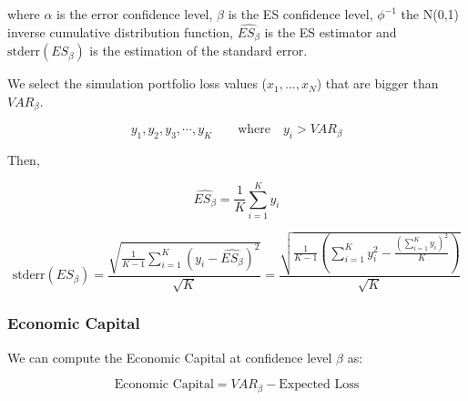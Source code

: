 \documentclass[a4paper,12pt,final]{article}
\begin{document}
where $\alpha$ is the error confidence level, $\beta$ is the ES confidence 
level, $\phi^{-1}$ the N(0,1) inverse cumulative distribution function, 
$\widehat{ES_{\beta}}$ is the ES estimator and $\textrm{stderr}(ES_{\beta})$
is the estimation of the standard error.
\newline

We select the simulation portfolio loss values ($x_1, ..., x_N$) that are bigger 
than $VAR_{\beta}$.

\begin{displaymath}
y_1, y_2, y_3, \cdots, y_K \qquad \textrm{where} \quad y_i > VAR_{\beta}
\end{displaymath}

Then,

\begin{displaymath}
\widehat{ES_{\beta}} = \frac{1}{K} \sum_{i=1}^{K} y_i
\end{displaymath}

\begin{displaymath}
\textrm{stderr}(ES_{\beta}) =
\frac{\sqrt{\frac{1}{K-1} \sum_{i=1}^{K} \left( y_i - \widehat{ES_{\beta}} \right)^2}}{\sqrt{K}} =
\frac{\sqrt{\frac{1}{K-1} \left( \sum_{i=1}^{K} y_i^2 - \frac{\left(\sum_{i=1}^{K} y_i \right)^2}{K} \right)}}{\sqrt{K}}
\end{displaymath}

\subsubsection{Economic Capital}
We can compute the Economic Capital at confidence level $\beta$ as:

\begin{displaymath}
\textrm{Economic Capital} = VAR_{\beta} - \textrm{Expected Loss}
\end{displaymath}

\end{document}

